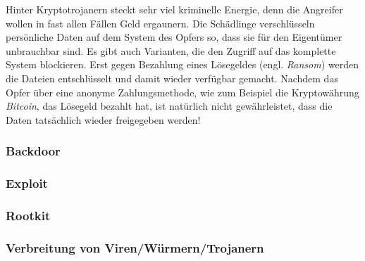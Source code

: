 Hinter Kryptotrojanern steckt sehr viel kriminelle Energie, denn die Angreifer wollen in fast allen Fällen Geld ergaunern. Die Schädlinge verschlüsseln persönliche Daten auf dem System des Opfers so, dass sie für den Eigentümer unbrauchbar sind. Es gibt auch Varianten, die den Zugriff auf das komplette System blockieren. Erst gegen Bezahlung eines Lösegeldes (engl. \textit{Ransom}) werden die Dateien entschlüsselt und damit wieder verfügbar gemacht. Nachdem das Opfer über eine anonyme Zahlungsmethode, wie zum Beispiel die Kryptowährung \textit{Bitcoin}, das Lösegeld bezahlt hat, ist natürlich nicht gewährleistet, dass die Daten tatsächlich wieder freigegeben werden!

\subsubsection{Backdoor}
\label{sec:Backdoor}



\subsubsection{Exploit}
\label{sec:Exploit}

\subsubsection{Rootkit}
\label{sec:Rootkit}

\subsubsection{Verbreitung von Viren/Würmern/Trojanern}
\label{sec:VerbreitungVirenWuermerTrojaner}
